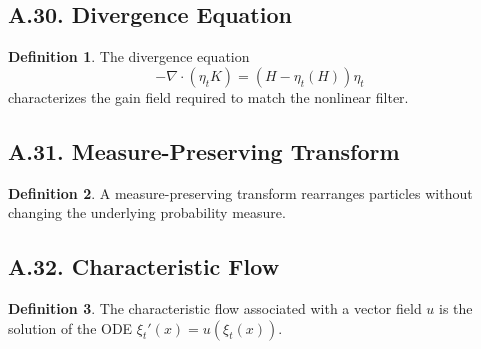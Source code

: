 \documentclass[11pt]{article}
\theoremstyle{definition}
\newtheorem{definition}{Definition}
\theoremstyle{remark}
\begin{document}
\subsection*{A.30. Divergence Equation}
\begin{definition}
The divergence equation
\[
-\nabla\cdot(\eta_t K)=(H-\eta_t(H))\eta_t
\]
characterizes the gain field required to match the nonlinear filter.
\end{definition}

\subsection*{A.31. Measure-Preserving Transform}
\begin{definition}
A measure-preserving transform rearranges particles without changing the underlying probability measure.
\end{definition}

\subsection*{A.32. Characteristic Flow}
\begin{definition}
The characteristic flow associated with a vector field \(u\) is the solution of the ODE \(\xi_t'(x)=u(\xi_t(x))\).
\end{definition}
\end{document}
